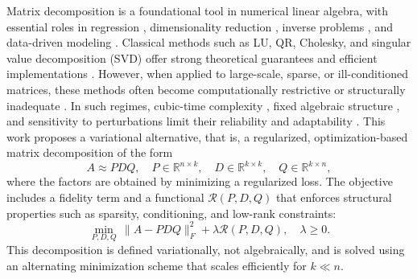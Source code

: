 \documentclass[10pt,a4paper]{article}
\begin{document}
Matrix decomposition is a foundational tool in numerical linear algebra, with essential roles in regression \cite{mat2, mat5}, dimensionality reduction \cite{mat1, mat7}, inverse problems \cite{mat2, mat6}, and data-driven modeling \cite{mat1, mat3, mat4}. Classical methods such as LU, QR, Cholesky, and singular value decomposition (SVD) offer strong theoretical guarantees  \cite{udell2019why, mat12} and efficient implementations \cite{recht2010guaranteed, mat8}. However, when applied to large-scale, sparse, or ill-conditioned matrices, these methods often become computationally restrictive or structurally inadequate \cite{mat9, mat14}. In such regimes, cubic-time complexity \cite{mat9}, fixed algebraic structure \cite{mat14}, and sensitivity to perturbations limit their reliability and adaptability \cite{mat20}. This work proposes a variational alternative, that is, a regularized, optimization-based matrix decomposition of the form
\[
A \approx P D Q, \quad P \in \mathbb{R}^{n \times k}, \quad D \in \mathbb{R}^{k \times k}, \quad Q \in \mathbb{R}^{k \times n},
\]
where the factors are obtained by minimizing a regularized loss. The objective includes a fidelity term and a functional \( \mathcal{R}(P, D, Q) \) that enforces structural properties such as sparsity, conditioning, and low-rank constraints:
\[
\min_{P, D, Q} \, \|A - P D Q\|_F^2 + \lambda \mathcal{R}(P, D, Q), \quad \lambda \geq 0.
\]
This decomposition is defined variationally, not algebraically, and is solved using an alternating minimization scheme that scales efficiently for \( k \ll n \).
\end{document}
